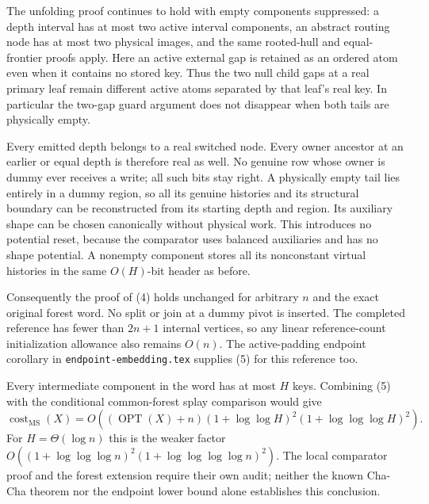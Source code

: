 \documentclass[11pt]{article}
\newcommand{\cost}{\operatorname{cost}}
\newcommand{\OPT}{\operatorname{OPT}}
\newcommand{\MS}{\mathrm{MS}}
\begin{document}
The unfolding proof continues to hold with empty components suppressed:
a depth interval has at most two active interval components, an
abstract routing node has at most two physical images, and the same
rooted-hull and equal-frontier proofs apply. Here an active external
gap is retained as an ordered atom even when it contains no stored
key. Thus the two null child gaps at a real primary leaf remain
different active atoms separated by that leaf's real key. In
particular the two-gap guard argument does not disappear when both
tails are physically empty.

Every emitted depth belongs to a real switched node. Every owner
ancestor at an earlier or equal depth is therefore real as well.
No genuine row whose owner is dummy ever receives a write; all such
bits stay right. A physically empty tail lies entirely in a dummy
region, so all its genuine histories and its structural boundary can
be reconstructed from its starting depth and region. Its auxiliary
shape can be chosen canonically without physical work. This introduces
no potential reset, because the comparator uses balanced auxiliaries
and has no shape potential. A nonempty component stores all its
nonconstant virtual histories in the same $O(H)$-bit header as before.

Consequently the proof of (4) holds unchanged for arbitrary $n$ and
the exact original forest word. No split or join at a dummy pivot is
inserted. The completed reference has fewer than $2n+1$ internal
vertices, so any linear reference-count initialization allowance also
remains $O(n)$. The active-padding endpoint corollary in
\texttt{endpoint-embedding.tex} supplies (5) for this reference too.

Every intermediate component in the word has at most $H$ keys.
Combining (5) with the conditional common-forest splay comparison
would give
\[
 \cost_{\MS}(X)=
 O\!\left((\OPT(X)+n)
     (1+\log\log H)^2
     (1+\log\log\log H)^2\right).
\]
For $H=\Theta(\log n)$ this is the weaker factor
$O((1+\log\log\log n)^2
    (1+\log\log\log\log n)^2)$.
The local comparator proof and the forest extension require their
own audit; neither the known Cha-Cha theorem nor the endpoint
lower bound alone establishes this conclusion.
\end{document}
